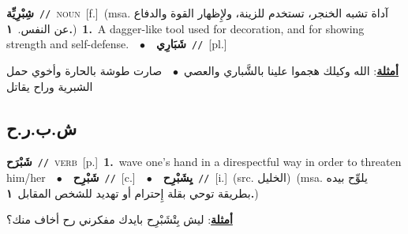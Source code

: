 \documentclass[10pt,a4paper,twoside]{article} %
\begin{document}
\begin{multicols}{2}
{\setlength\topsep{0pt}\textbf{\foreignlanguage{arabic}{شِبْرِيِّة}}\ {\color{gray}\texttt{//}\color{black}}\ \textsc{noun}\ [f.]\ \color{gray}(msa. \foreignlanguage{arabic}{آداة تشبه الخنجر، تستخدم للزينة، ولإِظهار القوة والدفاع عن النفس.}~\foreignlanguage{arabic}{\textbf{١.}})\color{black}\ \textbf{1.}~A dagger-like tool used for decoration, and for showing strength and self-defense.\ \ $\bullet$\ \ \setlength\topsep{0pt}\textbf{\foreignlanguage{arabic}{شَبَارِي}}\ {\color{gray}\texttt{//}\color{black}}\ [pl.]\  \begin{flushright}\color{gray}\foreignlanguage{arabic}{\textbf{\underline{\foreignlanguage{arabic}{أمثلة}}}: الله وكيلك هجموا علينا بالشَّباري والعصي\ $\bullet$\ \  صارت طوشة بالحارة وأخوي حمل الشبرية وراح يقاتل}\end{flushright}\color{black}} \vspace{2mm}

\vspace{-3mm}
\subsection*{\color{blue}\foreignlanguage{arabic}{ش.ب.ر.ح}\color{blue}{}} 

{\setlength\topsep{0pt}\textbf{\foreignlanguage{arabic}{شَبْرَح}}\ {\color{gray}\texttt{//}\color{black}}\ \textsc{verb}\ [p.]\ \textbf{1.}~wave one's hand in a direspectful way in order to threaten him/her\ \ $\bullet$\ \ \setlength\topsep{0pt}\textbf{\foreignlanguage{arabic}{شَبْرِح}}\ {\color{gray}\texttt{//}\color{black}}\ [c.]\ \ $\bullet$\ \ \setlength\topsep{0pt}\textbf{\foreignlanguage{arabic}{يِشَبْرِح}}\ {\color{gray}\texttt{//}\color{black}}\ [i.]\ (src. \color{gray}\foreignlanguage{arabic}{الخليل}\color{black})\ \color{gray}(msa. \foreignlanguage{arabic}{يلوِّح بيده بطريقة توحي بقلة إِحترام أو تهديد للشخص المقابل}~\foreignlanguage{arabic}{\textbf{١.}})\color{black}\  \begin{flushright}\color{gray}\foreignlanguage{arabic}{\textbf{\underline{\foreignlanguage{arabic}{أمثلة}}}: ليش بِتْشَبْرِح بايدك مفكرني رح أخاف منك؟}\end{flushright}\color{black}} \vspace{2mm}


\end{multicols}
\end{document}

